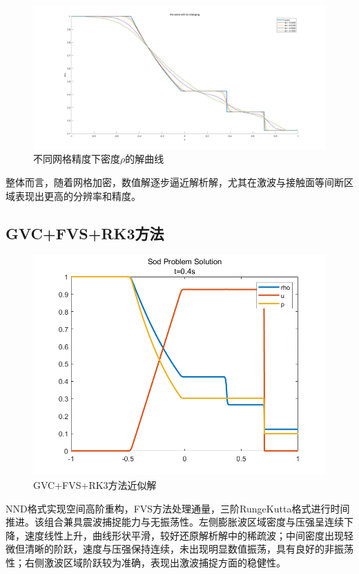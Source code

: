 \documentclass[12pt,a4paper]{article}%
\begin{document}
		\begin{figure}[H]
			\centering
			\begin{minipage}{1\textwidth}
				\centering
				\includegraphics[width=\textwidth]{./fig/rho.png}
				\caption{\fontsize{10pt}{15pt}\selectfont 不同网格精度下密度$\rho$的解曲线}
			\end{minipage}
		\end{figure}
		整体而言，随着网格加密，数值解逐步逼近解析解，尤其在激波与接触面等间断区域表现出更高的分辨率和精度。
		
		
		\subsection{GVC+FVS+RK3方法}
		\begin{figure}[H]
			\centering
			\begin{minipage}{1\textwidth}
				\centering
				\includegraphics[width=\textwidth]{./fig/app1.png}
				\caption{\fontsize{10pt}{15pt}\selectfont GVC+FVS+RK3方法近似解}
			\end{minipage}
		\end{figure}
		NND格式实现空间高阶重构，FVS方法处理通量，三阶RungeKutta格式进行时间推进。该组合兼具震波捕捉能力与无振荡性。左侧膨胀波区域密度与压强呈连续下降，速度线性上升，曲线形状平滑，较好还原解析解中的稀疏波；中间密度出现轻微但清晰的阶跃，速度与压强保持连续，未出现明显数值振荡，具有良好的非振荡性；右侧激波区域阶跃较为准确，表现出激波捕捉方面的稳健性。
		
\end{document}
